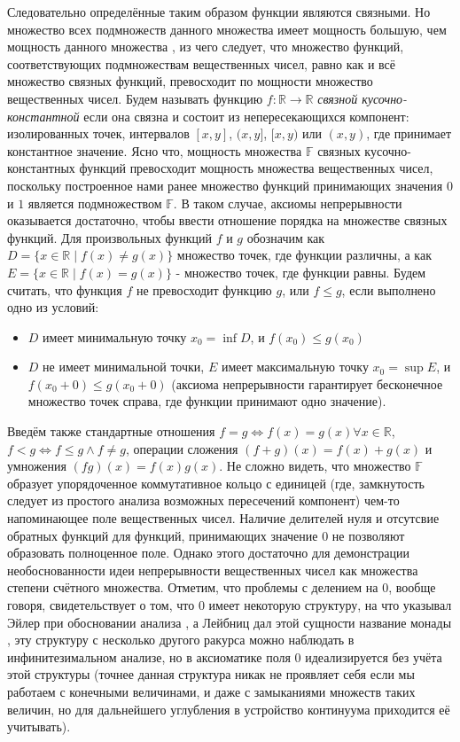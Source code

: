 \documentclass[12pt]{article}
\begin{document}
Следовательно определённые таким образом функции являются связными. Но множество всех подмножеств данного множества имеет мощность большую, чем мощность данного множества \cite{cantor-common}, из чего следует, что множество функций, соответствующих подмножествам вещественных чисел, равно как и всё множество связных функций, превосходит по мощности множество вещественных чисел. Будем называть функцию $f: \mathbb{R} \to \mathbb{R}$ {\it связной кусочно-константной} если она связна и состоит из непересекающихся компонент: изолированных точек, интервалов $[x, y]$, $(x, y]$, $[x, y)$ или $(x, y)$, где принимает константное значение. Ясно что, мощность множества $\mathbb{F}$ связных кусочно-константных функций превосходит мощность множества вещественных чисел, поскольку построенное нами ранее множество функций принимающих значения $0$ и $1$ является подмножеством $\mathbb{F}$. В таком случае, аксиомы непрерывности оказывается достаточно, чтобы ввести отношение порядка на множестве связных функций. Для произвольных функций $f$ и $g$ обозначим как $D = \{x \in \mathbb{R} \mid f(x) \neq g(x)\}$ множество точек, где функции различны, а как $E = \{x \in \mathbb{R} \mid f(x) = g(x)\}$ - множество точек, где функции равны. Будем считать, что функция $f$ не превосходит функцию $g$, или $f \leq g$, если выполнено одно из условий:

\begin{itemize}
    \item $D$ имеет минимальную точку $x_0 = \inf D$, и $f(x_0) \leq g(x_0)$
    \item $D$ не имеет минимальной точки, $E$ имеет максимальную точку $x_0 = \sup E$, и $f(x_0 + 0) \leq g(x_0 + 0)$ (аксиома непрерывности гарантирует бесконечное множество точек справа, где функции принимают одно значение).
\end{itemize}

Введём также стандартные отношения $f = g \Leftrightarrow f(x) = g(x) \forall x \in \mathbb{R}$, $f < g \Leftrightarrow f \leq g \wedge f \neq g$, операции сложения $(f + g)(x) = f(x) + g(x)$ и умножения $(fg)(x) = f(x)g(x)$. Не сложно видеть, что множество $\mathbb{F}$ образует упорядоченное коммутативное кольцо с единицей (где, замкнутость следует из простого анализа возможных пересечений компонент) чем-то напоминающее поле вещественных чисел. Наличие делителей нуля и отсутсвие обратных функций для функций, принимающих значение 0 не позволяют образовать полноценное поле. Однако этого достаточно для демонстрации необоснованности идеи непрерывности вещественных чисел как множества степени счётного множества. Отметим, что проблемы с делением на $0$, вообще говоря, свидетельствует о том, что $0$ имеет некоторую структуру, на что указывал Эйлер при обосновании анализа \cite{infinitesimal-euler}, а Лейбниц дал этой сущности название монады \cite{infinitesimal-leibnitz}, эту структуру с несколько другого ракурса можно наблюдать в инфинитезимальном анализе, но в аксиоматике поля $0$ идеализируется без учёта этой структуры (точнее данная структура никак не проявляет себя если мы работаем с конечными величинами, и даже с замыканиями множеств таких величин, но для дальнейшего углубления в устройство континуума приходится её учитывать).
\end{document}
